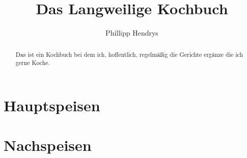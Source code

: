 \documentclass[%
a4paper,
11pt
]{article}
\begin{document}
\title{\textbf{Das Langweilige Kochbuch}}
\author{Phillipp Hendrys}%
\maketitle

\begin{abstract}
    \noindent Das ist ein Kochbuch bei dem ich, hoffentlich, regelmäßig die Gerichte ergänze die ich gerne Koche.
\end{abstract}

\tableofcontents

\vspace{5em}

\section{Hauptspeisen}


\section{Nachspeisen}






%
\end{document}
